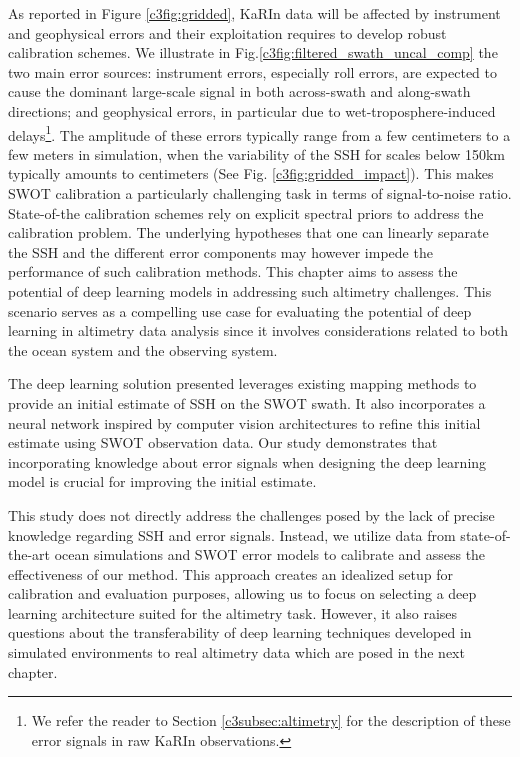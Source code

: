 \begin{bibunit}
As reported in Figure \ref{c3fig:gridded}, KaRIn data will be affected by instrument and geophysical errors  \cite{ubelmann_swot_nodate} and their exploitation requires to develop robust calibration schemes. We illustrate in Fig.\ref{c3fig:filtered_swath_uncal_comp} the two main error sources: instrument errors, especially roll errors, are expected to cause the dominant large-scale signal in both across-swath and along-swath directions; and geophysical errors, in particular due to wet-troposphere-induced delays\footnote{We refer the reader to Section \ref{c3subsec:altimetry} for the description of these error signals in raw KaRIn observations.}.
The amplitude of these errors typically range from a few centimeters to a few meters in simulation, when the variability of the SSH for scales below 150km typically amounts to centimeters (See Fig. \ref{c3fig:gridded_impact}). This makes SWOT calibration a particularly challenging task in terms of signal-to-noise ratio. State-of-the calibration schemes \cite{Dibarboure_Ubelmann_Flamant_Briol_Peral_Bracher_Vergara_Faugere_Soulat_Picot_2022} rely on explicit spectral priors to address the calibration problem. 
The underlying hypotheses that one can linearly separate the SSH and the different error components may however impede the performance of such calibration methods. This chapter aims to assess the potential of deep learning models in addressing such altimetry challenges. This scenario serves as a compelling use case for evaluating the potential of deep learning in altimetry data analysis since it involves considerations related to both the ocean system and the observing system.

The deep learning solution presented leverages existing mapping methods to provide an initial estimate of SSH on the SWOT swath. It also incorporates a neural network inspired by computer vision architectures to refine this initial estimate using SWOT observation data. Our study demonstrates that incorporating knowledge about error signals when designing the deep learning model is crucial for improving the initial estimate.

This study does not directly address the challenges posed by the lack of precise knowledge regarding SSH and error signals. Instead, we utilize data from state-of-the-art ocean simulations and SWOT error models to calibrate and assess the effectiveness of our method. This approach creates an idealized setup for calibration and evaluation purposes, allowing us to focus on selecting a deep learning architecture suited for the altimetry task. However, it also raises questions about the transferability of deep learning techniques developed in simulated environments to real altimetry data which are posed in the next chapter.



\end{bibunit}
